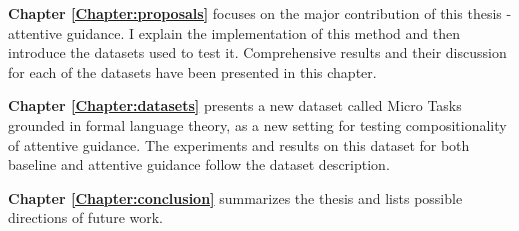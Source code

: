 	\textbf{Chapter \ref{Chapter:proposals}} focuses on the major contribution of this thesis - attentive guidance. I explain the implementation of this method and then introduce the datasets used to test it. Comprehensive results and their discussion for each of the datasets have been presented in this chapter.
	
	
	
	\textbf{Chapter \ref{Chapter:datasets}} presents a new dataset called Micro Tasks grounded in formal language theory, as a new setting for testing compositionality of attentive guidance. The experiments and results on this dataset for both baseline and attentive guidance follow the dataset description.
	
	\textbf{Chapter \ref{Chapter:conclusion}} summarizes the thesis and lists possible directions of future work.


				